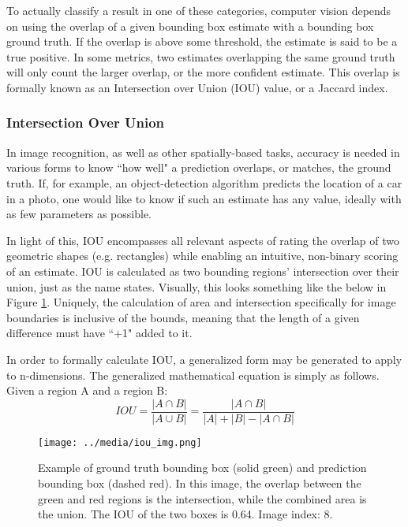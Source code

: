 To actually classify a result in one of these categories, computer vision depends on using the overlap of a given bounding box estimate with a bounding box ground truth. If the overlap is above some threshold, the estimate is said to be a true positive. In some metrics, two estimates overlapping the same ground truth will only count the larger overlap, or the more confident estimate. This overlap is formally known as an Intersection over Union (IOU) value, or a Jaccard index.

\subsubsection{Intersection Over Union}
In image recognition, as well as other spatially-based tasks, accuracy is needed in various forms to know ``how well" a prediction overlaps, or matches, the ground truth. If, for example, an object-detection algorithm predicts the location of a car in a photo, one would like to know if such an estimate has any value, ideally with as few parameters as possible.

In light of this, IOU encompasses all relevant aspects of rating the overlap of two geometric shapes (e.g. rectangles) while enabling an intuitive, non-binary scoring of an estimate. IOU is calculated as two bounding regions' intersection over their union, just as the name states. Visually, this looks something like the below in Figure \ref{iou_img}. Uniquely, the calculation of area and intersection specifically for image boundaries is inclusive of the bounds, meaning that the length of a given difference must have ``+1" added to it.

In order to formally calculate IOU, a generalized form may be generated to apply to n-dimensions. The generalized mathematical equation is simply as follows. Given a region A and a region B:
\begin{equation}
IOU = \frac{|A\cap B|}{|A\cup B|} = \frac{|A\cap B|}{|A|+|B|- |A\cap B|}
\end{equation}

\begin{figure}[ht]
    \texttt{[image: ../media/iou\_img.png]}
    \caption{Example of ground truth bounding box (solid green) and prediction bounding box (dashed red). In this image, the overlap between the green and red regions is the intersection, while the combined area is the union. The IOU of the two boxes is 0.64. Image index: 8.}
    \label{iou_img}
\end{figure}

